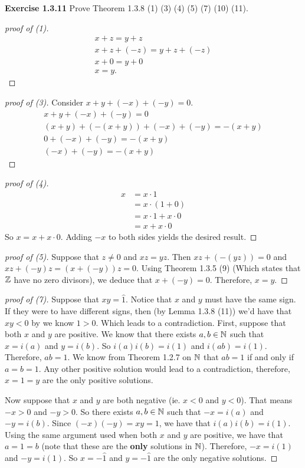 \noindent \textbf{Exercise 1.3.11} Prove Theorem 1.3.8 (1) (3) (4) (5) (7) (10) (11).
\begin{proof}[proof of (1)]
    \begin{gather*}
        x+z = y+z\\
        x + z + (-z) = y + z + (-z) \\
        x + 0 = y + 0\\
        x = y.
    \end{gather*}
\end{proof}
\begin{proof}[proof of (3)]
    Consider \(x + y + (-x) + (-y) = 0\).
    \begin{gather*}
        x+y + (-x) + (-y) = 0\\
        (x+y) + (-(x+y)) + (-x) + (-y) = -(x+y)\\
        0 + (-x) + (-y) = -(x+y)\\
        (-x) + (-y) = -(x+y)
    \end{gather*}
\end{proof}
\begin{proof}[proof of (4)]
    \begin{align*}
        x &= x \cdot 1 \\
        &= x \cdot (1 + 0) \\
        &= x \cdot 1 + x \cdot 0 \\
        &= x + x \cdot 0
    \end{align*}
    So \(x = x + x\cdot 0\). Adding \(-x\) to both sides yields the desired result.
\end{proof}
\begin{proof}[proof of (5)]
    Suppose that \(z \neq 0\) and \(xz = yz\). Then \(xz + (-(yz)) = 0\) and \(xz + (-y)z = (x + (-y))z = 0\).
    Using Theorem 1.3.5 (9) (Which states that \(\mathbb{Z}\) have no zero divisors), we deduce that \(x + (-y) = 0\). Therefore, \(x = y\).
\end{proof}
\begin{proof}[proof of (7)]
    Suppose that \(xy = \hat{1}\). Notice that \(x\) and \(y\) must have the same sign. If they were to have different signs, then (by Lemma 1.3.8 (11)) we'd have that \(xy < 0\) by we know \(1 > 0\). Which leads to a contradiction.
    First, suppose that both \(x\) and \(y\) are positive. We know that there exists \(a,b \in \mathbb{N}\) such that \(x = i(a)\) and \(y = i(b)\). So \(i(a)i(b) = i(1)\) and \(i(ab) = i(1)\). Therefore, \(ab = 1\). We know from Theorem 1.2.7 on \(\mathbb{N}\) that \(ab = 1\) if and only if \(a = b = 1\). Any other positive solution would lead to a contradiction, therefore, \(x = 1 = y\) are the only positive solutions.
    \par Now suppose that \(x\) and \(y\) are both negative (ie. \(x < 0\) and \(y < 0\)). That means \(-x > 0\) and \(-y > 0\). So there exists \(a,b \in \mathbb{N}\) such that \(-x = i(a)\) and \(-y = i(b)\). Since \((-x)(-y) = xy = 1\), we have that \(i(a)i(b) = i(1)\). Using the same argument used when both \(x\) and \(y\) are positive, we have that \(a = 1 = b\) (note that these are the \textbf{only} solutions in \(\mathbb{N}\)). Therefore, \(-x = i(1)\) and \(-y = i(1)\). So \(x = -\hat{1}\) and \(y = -\hat{1}\) are the only negative solutions.
\end{proof}
